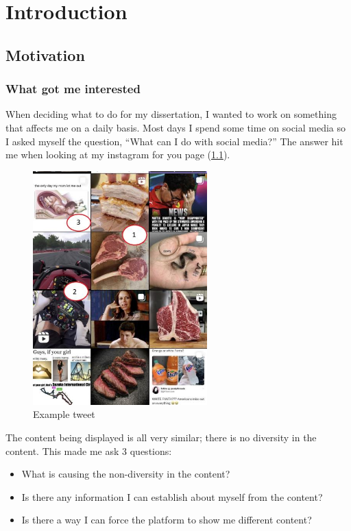 \chapter{Introduction}
\label{ch:introduction}

\section{Motivation}
\subsection{What got me interested}
When deciding what to do for my dissertation, I wanted to work on something that affects me on a daily basis.
Most days I spend some time on social media so I asked myself the question, ``What can I do with social media?'' The answer hit me
when looking at my instagram for you page (\cref{fig:motivation-example}). 
\begin{figure}[hbtp]
    \centering
    \includegraphics[width=0.6\textwidth]{../images/tweet-example.png}
    \caption{Example tweet}
    \label{fig:motivation-example}
\end{figure}

The content being displayed is all very similar; there is no diversity in the content. This made me ask 3 questions:
\begin{itemize}
    \item What is causing the non-diversity in the content?
    \item Is there any information I can establish about myself from the content?
    \item Is there a way I can force the platform to show me different content?
\label{list:main-questions}
\end{itemize}

